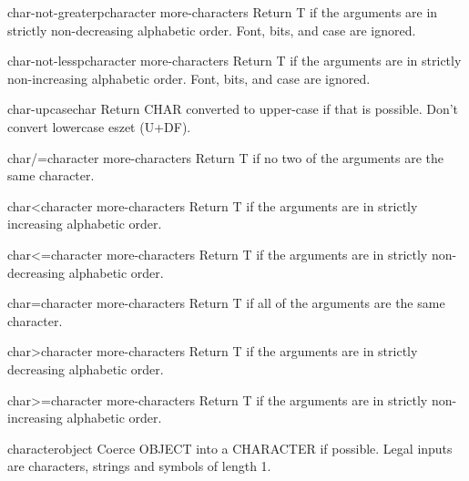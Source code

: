 \begin{function}{char-not-greaterp}{character \rest more-characters}{}
  Return T if the arguments are in strictly non-decreasing alphabetic order.
   Font, bits, and case are ignored.
\end{function}

\begin{function}{char-not-lessp}{character \rest more-characters}{}
  Return T if the arguments are in strictly non-increasing alphabetic order.
   Font, bits, and case are ignored.
\end{function}

\begin{function}{char-upcase}{char}{}
  Return CHAR converted to upper-case if that is possible.  Don't convert
   lowercase eszet (U+DF).
\end{function}

\begin{function}{char/=}{character \rest more-characters}{}
  Return T if no two of the arguments are the same character.
\end{function}

\begin{function}{char<}{character \rest more-characters}{}
  Return T if the arguments are in strictly increasing alphabetic order.
\end{function}

\begin{function}{char<=}{character \rest more-characters}{}
  Return T if the arguments are in strictly non-decreasing alphabetic order.
\end{function}

\begin{function}{char=}{character \rest more-characters}{}
  Return T if all of the arguments are the same character.
\end{function}

\begin{function}{char>}{character \rest more-characters}{}
  Return T if the arguments are in strictly decreasing alphabetic order.
\end{function}

\begin{function}{char>=}{character \rest more-characters}{}
  Return T if the arguments are in strictly non-increasing alphabetic order.
\end{function}

\begin{function}{character}{object}{}
  Coerce OBJECT into a CHARACTER if possible. Legal inputs are
  characters, strings and symbols of length 1.
\end{function}

